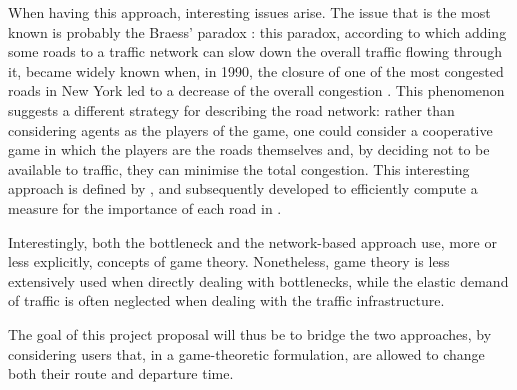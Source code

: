 \documentclass{article}
\begin{document}
When having this approach, interesting issues arise.
The issue that is the most known is probably the Braess' paradox \parencite[originally published in German in 1968, translated in][]{braess2005paradox}:
this paradox, according to which adding some roads to a traffic network can slow down the overall traffic flowing through it,
became widely known when, in 1990,
the closure of one of the most congested roads in New York led to a decrease of the overall congestion \parencite{kolata_1990}.
This phenomenon suggests a different strategy for describing the road network:
rather than considering agents as the players of the game,
one could consider a cooperative game in which the players are the roads themselves and,
by deciding not to be available to traffic,
they can minimise the total congestion.
This interesting approach is defined by \textcite{HADAS2017120},
and subsequently developed to efficiently compute a measure for the importance of each road in
\textcite{gnecco2021public,passacantando2021braess}.

Interestingly, both the bottleneck and the network-based approach use,
more or less explicitly, concepts of game theory.
Nonetheless, game theory is less extensively used when directly dealing with bottlenecks,
while the elastic demand of traffic is often neglected when dealing with the traffic infrastructure.

The goal of this project proposal will thus be to bridge the two approaches,
by considering users that, in a game-theoretic formulation,
are allowed to change both their route and departure time.

\newpage
\printbibliography
\end{document}
